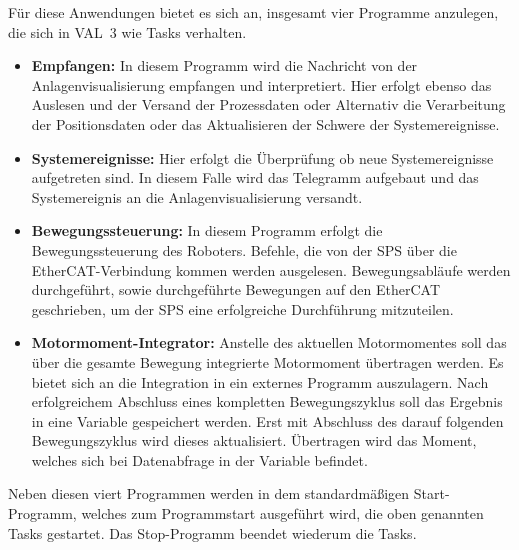 \documentclass[ a4paper,
                oneside,
                toc=bibliography,
                toc=listof
                ]{scrbook}
\begin{document}
	Für diese Anwendungen bietet es sich an, insgesamt vier Programme anzulegen, die sich in VAL~3 wie Tasks verhalten.
	\begin{itemize}
		\item \textbf{Empfangen: } In diesem Programm wird die Nachricht von der Anlagenvisualisierung empfangen und interpretiert. Hier erfolgt ebenso das Auslesen und der Versand der Prozessdaten oder Alternativ die Verarbeitung der Positionsdaten oder das Aktualisieren der Schwere der Systemereignisse.
		\item \textbf{Systemereignisse: } Hier erfolgt die Überprüfung ob neue Systemereignisse aufgetreten sind. In diesem Falle wird das Telegramm aufgebaut und das Systemereignis an die Anlagenvisualisierung versandt. 
		\item \textbf{Bewegungssteuerung:} In diesem Programm erfolgt die Bewegungssteuerung des Roboters. Befehle, die von der SPS über die EtherCAT-Verbindung kommen werden ausgelesen. Bewegungsabläufe werden durchgeführt, sowie durchgeführte Bewegungen auf den EtherCAT geschrieben, um der SPS eine erfolgreiche Durchführung mitzuteilen.
		\item \textbf{Motormoment-Integrator:} Anstelle des aktuellen Motormomentes soll das über die gesamte Bewegung integrierte Motormoment übertragen werden. Es bietet sich an die Integration in ein externes Programm auszulagern. Nach erfolgreichem Abschluss eines kompletten Bewegungszyklus soll das Ergebnis in eine Variable gespeichert werden. Erst mit Abschluss des darauf folgenden Bewegungszyklus wird dieses aktualisiert. Übertragen wird das Moment, welches sich bei Datenabfrage in der Variable befindet.
	\end{itemize}
	Neben diesen viert Programmen werden in dem standardmäßigen \glqq Start\grqq-Programm, welches zum Programmstart ausgeführt wird, die oben genannten Tasks gestartet. Das \glqq Stop\grqq{}-Programm beendet wiederum die Tasks.
	\newpage
\end{document}
